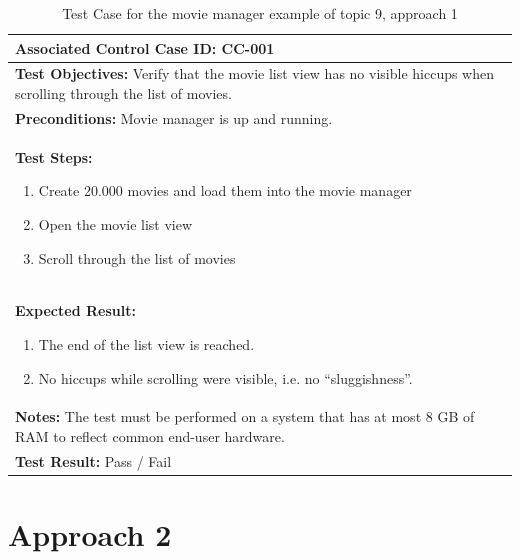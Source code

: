 %
%
%
\begin{table}[h!]
	\centering
	\caption{Test Case for the movie manager example of topic 9, approach 1}
	\label{tbl:topic_9_test_case}
	\begin{tabular}{|p{}|}\hline
		\textbf{Associated Control Case ID:} CC-001\\
		\hline
		\textbf{Test Objectives:} \newline Verify that the movie list view has no visible hiccups when scrolling through the list of movies. \\
		\hline
		\textbf{Preconditions:} Movie manager is up and running.\\
		\hline
		\textbf{Test Steps:} \begin{enumerate}
			\item Create 20.000 movies and load them into the movie manager
			\item Open the movie list view
			\item Scroll through the list of movies
		\end{enumerate} \\
		\hline
		\textbf{Expected Result:} \begin{enumerate}
			\item The end of the list view is reached.
			\item No hiccups while scrolling were visible, i.e. no \enquote{sluggishness}.
		\end{enumerate} \\
		\hline
		\textbf{Notes:} \newline
		The test must be performed on a system that has at most 8 GB of RAM to reflect common end-user hardware. \\
		\hline
		\textbf{Test Result:} Pass / Fail \\
		\hline
										
	\end{tabular}
\end{table}


\section{Approach 2} \label{sec:9_approach_2}


